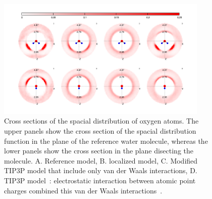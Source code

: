 \documentclass[aps,prl,reprint,amsmath,amssymb]{revtex4-1}
\begin{document}
\begin{figure}
\includegraphics[width=0.9\textwidth]{SDF}
\caption{Cross sections of the spacial distribution of oxygen atoms. 
The upper panels show the cross section of the spacial distribution function in the plane of the reference water molecule, whereas the lower panels show the cross section in the plane disecting the molecule. 
A. Reference model, B. localized model, C. Modified TIP3P model that include only van der Waals interactions, D. TIP3P model~\cite{TIP3P}: electrostatic interaction between atomic point charges combined this van der Waals interactions~\cite{TIP3P}.} \label{Fig:SDF}
\end{figure}


\end{document}
